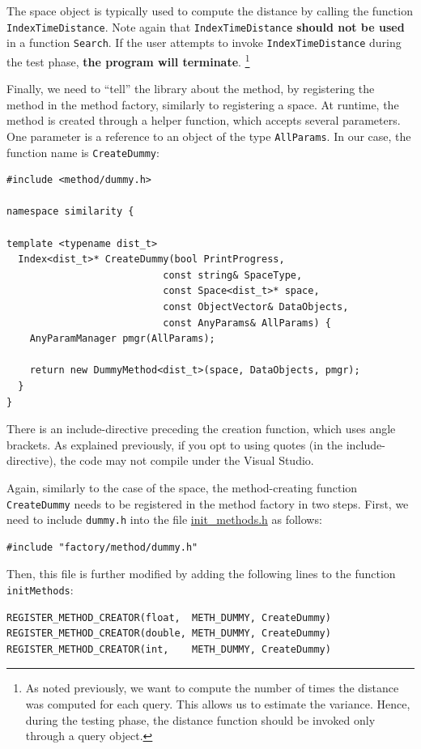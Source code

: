 \documentclass[runningheads,a4paper]{llncs}
\newcommand{\replocfile}{https://github.com/searchivarius/NonMetricSpaceLib/blob/pserv/}
\newcommand{\ttt}[1]{\texttt{#1}}
\begin{document}
The space object is typically used to compute the distance by calling
the function \ttt{IndexTimeDistance}.
Note again that \ttt{IndexTimeDistance} \textbf{should not be used} in a function
\ttt{Search}. 
If the user attempts to invoke \ttt{IndexTimeDistance} during the test phase,
\textbf{the program will terminate}.
\footnote{As noted previously, we want to compute the number of times
the distance was computed for each query. This allows us to estimate the variance.
Hence, during the testing phase, the distance function should be invoked only through
a query object.}


Finally, we need to ``tell'' the library about the method,
by registering the method in the method factory,
similarly to registering a space.
At runtime, the method is created through a helper function,
which accepts several parameters.
One parameter is a reference to an object of the type \ttt{AllParams}.
In our case, the function name is \ttt{CreateDummy}:

\begin{verbatim}
#include <method/dummy.h>

namespace similarity {

template <typename dist_t>
  Index<dist_t>* CreateDummy(bool PrintProgress,
                           const string& SpaceType,
                           const Space<dist_t>* space,
                           const ObjectVector& DataObjects,
                           const AnyParams& AllParams) {
    AnyParamManager pmgr(AllParams);

    return new DummyMethod<dist_t>(space, DataObjects, pmgr);
  }
}
\end{verbatim}
There is an include-directive preceding
the creation function, which uses angle brackets.
As explained previously, if you opt to using quotes (in the include-directive),
the code may not compile under the Visual Studio.

Again, similarly to the case of the space, 
the method-creating function \ttt{CreateDummy} needs
to be registered in the method factory in two steps.
First, we need to include \ttt{dummy.h} into the file
\href{\replocfile similarity_search/include/factory/init_methods.h}{init\_methods.h} as follows:
\begin{verbatim}
#include "factory/method/dummy.h"
\end{verbatim}
Then, this file is further modified by adding the following lines to the function \ttt{initMethods}:
\begin{verbatim}
REGISTER_METHOD_CREATOR(float,  METH_DUMMY, CreateDummy)
REGISTER_METHOD_CREATOR(double, METH_DUMMY, CreateDummy)
REGISTER_METHOD_CREATOR(int,    METH_DUMMY, CreateDummy)
\end{verbatim}
\end{document}
